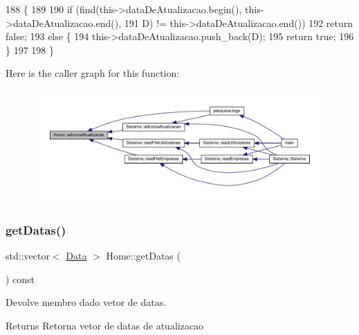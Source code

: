 \begin{DoxyCode}
188                                               \{
189 
190     \textcolor{keywordflow}{if} (find(this->dataDeAtualizacao.begin(), this->dataDeAtualizacao.end(),
191             D) != this->dataDeAtualizacao.end())
192         \textcolor{keywordflow}{return} \textcolor{keyword}{false};
193     \textcolor{keywordflow}{else} \{
194         this->dataDeAtualizacao.push\_back(D);
195         \textcolor{keywordflow}{return} \textcolor{keyword}{true};
196     \}
197 
198  \}
\end{DoxyCode}
Here is the caller graph for this function\+:
\nopagebreak
\begin{figure}[H]
\begin{center}
\leavevmode
\includegraphics[width=350pt]{classHome_a94aec68b520d98ac38c6794b5771cd53_icgraph}
\end{center}
\end{figure}
\mbox{\label{classHome_a0ab7279a76525f48cb1b64b8bae98a44}} 
\subsubsection{\texorpdfstring{get\+Datas()}{getDatas()}}
{\footnotesize\ttfamily std\+::vector$<$ \hyperlink{classData}{Data} $>$ Home\+::get\+Datas (\begin{DoxyParamCaption}{ }\end{DoxyParamCaption}) const}



Devolve membro dado vetor de datas. 

\begin{DoxyReturn}{Returns}
Retorna vetor de datas de atualizacao 
\end{DoxyReturn}

